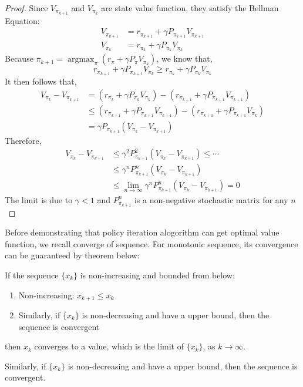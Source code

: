 \begin{proof}
	Since $V_{\pi_{k+1}}$ and $V_{\pi_{k}}$ are state value function, they satisfy the Bellman Equation:
	\begin{align*}
		V_{\pi_{k+1}} & = r_{\pi_{k+1}} + \gamma P_{\pi_{k+1}}V_{\pi_{k+1}} \\
		V_{\pi_{k}}   & = r_{\pi_{k}} + \gamma P_{\pi_{k}}V_{\pi_{k}}
	\end{align*}
	Because $\pi_{k+1}=\mathop{\arg\max}_{\pi}(r_{\pi}+\gamma P_{\pi}V_{\pi_{k}})$, we know that,
	\begin{equation*}
		r_{\pi_{k+1}} + \gamma P_{\pi_{k+1}}V_{\pi_{k}} \ge r_{\pi_{k}} + \gamma P_{\pi_{k}}V_{\pi_{k}}
	\end{equation*}
	It then follows that,
	\begin{align*}
		V_{\pi_{k}} - V_{\pi_{k+1}} & = \left(r_{\pi_{k}} + \gamma P_{\pi_{k}}V_{\pi_{k}}\right) - \left(r_{\pi_{k+1}}+\gamma P_{\pi_{k+1}}V_{\pi_{k+1}}\right)       \\
		                            & \le \left(r_{\pi_{k+1}} + \gamma P_{\pi_{k+1}}V_{\pi_{k+1}}\right) - \left(r_{\pi_{k+1}}+\gamma P_{\pi_{k+1}}V_{\pi_{k}}\right) \\
		                            & = \gamma P_{\pi_{k+1}}(V_{\pi_{k}}-V_{\pi_{k+1}})
	\end{align*}
	Therefore,
	\begin{align*}
		V_{\pi_{k}} - V_{\pi_{k+1}} & \le \gamma ^2 P_{\pi_{k+1}}^2(V_{\pi_{k}}-V_{\pi_{k+1}}) \le \cdots               \\
		                            & \le \gamma ^n P_{\pi_{k+1}}^n(V_{\pi_{k}}-V_{\pi_{k+1}})                          \\
		                            & \le \lim_{ n \to \infty }\gamma ^n P_{\pi_{k+1}}^n(V_{\pi_{k}}-V_{\pi_{k+1}}) = 0
	\end{align*}
	The limit is due to $\gamma<1$ and $P_{\pi_{k+1}}^n$ is a non-negative stochastic matrix for any $n$
\end{proof}

Before demonstrating that policy iteration alogorithm can get optimal value function, we recall converge of sequence. For monotonic sequence,
its convergence can be guaranteed by theorem below:
\begin{theorem}\label{thm:cms}
	If the sequence $\{x_{k}\}$ is non-increasing and bounded from below:
	\begin{enumerate}
		\item Non-increasing: $x_{k+1} \le x_{k}$
		\item Similarly, if $\{x_{k}\}$ is non-decreasing and have a upper bound, then the sequence is convergent
	\end{enumerate}
	then $x_{k}$ converges to a value, which is the limit of $\{x_{k}\}$, as $k\to \infty$.
\end{theorem}
Similarly, if $\{x_{k}\}$ is non-decreasing and have a upper bound, then the sequence is convergent.

